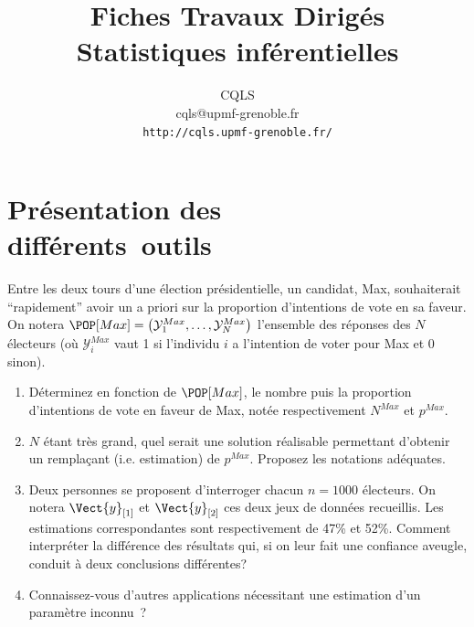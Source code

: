\documentclass[10pt]{report}
\title{\huge Fiches Travaux Dirigés\\Statistiques inférentielles}
\author{CQLS \\ cqls@upmf-grenoble.fr \\
\texttt{http://cqls.upmf-grenoble.fr/}}
\date{ }
\begin{document}
\maketitle





\chapter{Présentation des\\ différents~outils}\label{TdPres}


\begin{exercice}

Entre les deux tours d'une élection présidentielle, un candidat, Max, souhaiterait ``rapidement'' avoir un a priori sur la proportion d'intentions de vote en sa faveur. On notera $\POP[Max]=\left( \mathcal{Y}_1^{Max},\ldots, \mathcal{Y}_N^{Max}\right)$ l'ensemble des réponses des $N$ électeurs (où $\mathcal{Y}_i^{Max}$ vaut 1 si l'individu $i$ a l'intention de voter pour Max et 0 sinon).

\begin{enumerate}
\item Déterminez en fonction de $\POP[Max]$, le nombre puis la proportion d'intentions de vote en faveur de Max, notée respectivement $N^{Max}$ et $p^{Max}$.


\item $N$ étant très grand, quel serait une solution réalisable permettant d'obtenir un remplaçant (i.e. estimation) de $p^{Max}$. Proposez les notations adéquates.


\item Deux personnes se proposent d'interroger chacun $n=1000$ électeurs. On notera $\Vect{y}_{[1]}$ et $\Vect{y}_{[2]}$ ces deux jeux de données recueillis. Les estimations correspondantes sont respectivement de 47\% et 52\%. Comment interpréter la différence des résultats qui, si on leur fait une confiance aveugle, conduit à deux conclusions différentes?


\item Connaissez-vous d'autres applications nécessitant une estimation d'un paramètre inconnu~?


\end{enumerate}
\end{exercice}
\end{document}

